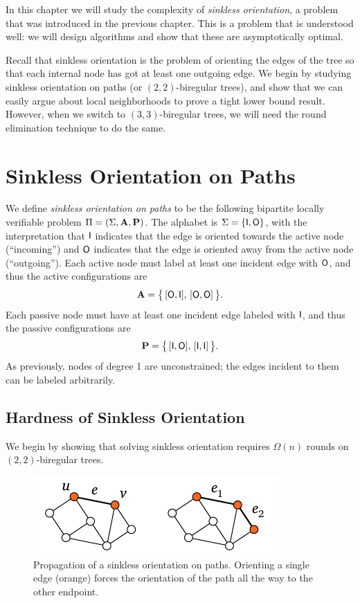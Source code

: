 

\noindent
In this chapter we will study the complexity of \emph{sinkless orientation}, a problem that was introduced in the previous chapter. This is a problem that is understood well: we will design algorithms and show that these are asymptotically optimal.

Recall that sinkless orientation is the problem of orienting the edges of the tree so that each internal node has got at least one outgoing edge. We begin by studying sinkless orientation on paths (or $(2,2)$-biregular trees), and show that we can easily argue about local neighborhoods to prove a tight lower bound result. However, when we switch to $(3,3)$-biregular trees, we will need the round elimination technique to do the same.

\section{Sinkless Orientation on Paths} \label{sec:so-paths}

We define \emph{sinkless orientation on paths} to be the following bipartite locally verifiable problem $\Pi = (\Sigma, \mathbf{A}, \mathbf{P})$. The alphabet is $\Sigma = \{ \mathsf{I}, \mathsf{O} \}$, with the interpretation that $\mathsf{I}$ indicates that the edge is oriented towards the active node (``incoming'') and $\mathsf{O}$ indicates that the edge is oriented away from the active node (``outgoing''). Each active node must label at least one incident edge with $\mathsf{O}$, and thus the active configurations are
\[
	\mathbf{A} = \bigl\{ \, [\mathsf{O}, \mathsf{I}],\, [\mathsf{O}, \mathsf{O}] \, \bigr\}. 
\]
Each passive node must have at least one incident edge labeled with $\mathsf{I}$, and thus the passive configurations are
\[
	\mathbf{P} = \bigl\{ \, [\mathsf{I}, \mathsf{O}],\,[\mathsf{I}, \mathsf{I}] \, \bigr\}. 
\]
As previously, nodes of degree 1 are unconstrained; the edges incident to them can be labeled arbitrarily.

\subsection{Hardness of Sinkless Orientation}\label{ssec:so-hard-paths}

We begin by showing that solving sinkless orientation requires $\Omega(n)$ rounds on $(2,2)$-biregular trees.

\begin{figure}
	\centering
	\includegraphics[page=\PSOPathIntuition,scale=0.4]{figs.pdf}
	\caption{Propagation of a sinkless orientation on paths. Orienting a single edge (orange) forces the orientation of the path all the way to the other endpoint.} \label{fig:so-intuition}
\end{figure}


